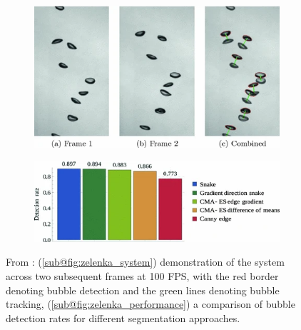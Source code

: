 \begin{figure}[H]
    \centering
    \begin{subfigure}{.40\textwidth}
        \centering
        \includegraphics[width=1\textwidth]{assets/zelenka_system.png}
        \caption{}
        \label{fig:zelenka_system}
    \end{subfigure}
    \hfill
    \begin{subfigure}{.55\textwidth}
        \centering
        \includegraphics[width=1\textwidth]{assets/zelenka_performance.png}
        \caption{}
        \label{fig:zelenka_performance}
    \end{subfigure}
    \caption{From \cite{zelenkaGasBubbleShape2014a}: (\ref{sub@fig:zelenka_system}) demonstration of the system across two subsequent frames at 100 FPS, with the red border denoting bubble detection and the green lines denoting bubble tracking, (\ref{sub@fig:zelenka_performance}) a comparison of bubble detection rates for different segmentation approaches.}
    \label{fig:zelenka}
\end{figure}

